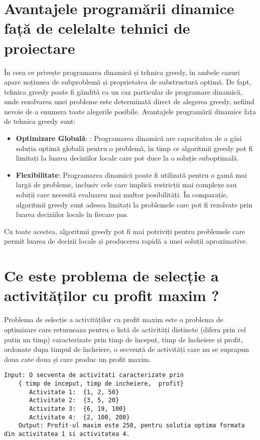 \section{Avantajele programării dinamice față de celelalte tehnici de proiectare}
În ceea ce privește programarea dinamică și tehnica greedy, 
în ambele cazuri apare noțiunea de subproblemă și proprietatea de substructură optimă. De fapt, tehnica greedy poate fi gândită ca un caz particular de programare dinamică, unde rezolvarea unei probleme este determinată direct de alegerea greedy, nefiind nevoie de a
enumera toate alegerile posibile.\cite{Curs} Avantajele programării dinamice fața de tehnica greedy sunt:
\begin{itemize}
  \item \textbf {Optimizare Globală}: : Programarea dinamică are capacitatea de a găsi soluția optimă globală pentru o problemă, în timp ce algoritmii greedy pot fi limitați la luarea deciziilor locale care pot duce la o soluție suboptimală.
  \item \textbf {Flexibilitate}: Programarea dinamică poate fi utilizată pentru o gamă mai largă de probleme, inclusiv cele care implică restricții mai complexe sau soluții care necesită evaluarea mai multor posibilități. În comparație, algoritmii greedy sunt adesea limitați la problemele care pot fi rezolvate prin luarea deciziilor locale în fiecare pas.
  
\end{itemize}
Cu toate acestea, algoritmii greedy pot fi mai potriviți pentru problemele care permit luarea de decizii locale și producerea rapidă a unei soluții aproximative.


\section{Ce este problema de selecție a activităților cu profit maxim ?}
Problema de selecție a activităților cu profit maxim este o problema de optimizare care returneaza pentru o listă de activități distincte (difera prin cel putin un timp) caracterizate prin timp de început, timp de încheiere și profit,  ordonate dupa timpul de încheiere, o secventă de activități care nu se suprapun doua cate doua și care produc un profit maxim. 
\begin{lstlisting}[numbers=None]
    Input: O secventa de activitati caracterizate prin
    { timp de inceput, timp de incheiere,  profit}
       Activitate 1:  {1, 2, 50} 
       Activitate 2:  {3, 5, 20}
       Activitate 3:  {6, 19, 100}
       Activitate 4:  {2, 100, 200}
    Output: Profit-ul maxim este 250, pentru solutia optima formata din activitatea 1 si activitatea 4.
\end{lstlisting}

